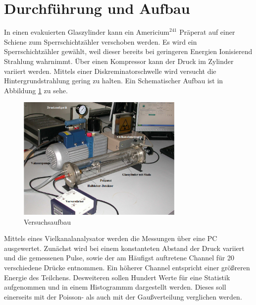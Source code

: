 \section{Durchführung und Aufbau}
\label{sec:Durchführung}
In einen evakuierten Glaszylinder kann ein $\text{Americium}^{241}$ Präperat auf einer Schiene zum Sperrschichtzähler verschoben werden. Es wird ein Sperrschichtzähler gewählt, weil dieser bereits bei geringeren Energien Ionisierend Strahlung wahrnimmt. Über einen Kompressor kann der Druck im Zylinder variiert werden. Mittels einer Diskreminatorschwelle wird versucht die Hintergrundstrahlung gering zu halten. Ein Schematischer Aufbau ist in Abbildung \ref{fig:Auf} zu sehe.
\begin{figure}
  \centering
  \includegraphics[height=6cm]{Aufbau.png}
  \caption{Versuchsaufbau}
  \label{fig:Auf}
\end{figure}
Mittels eines Vielkanalanalysator werden die Messungen über eine PC ausgewertet. Zunächst wird bei einem konstanteten Abstand der Druck variiert und die gemessenen Pulse, sowie der am Häufigst auftretene Channel für 20 verschiedene Drücke entnommen. Ein höherer Channel entspricht einer größreren Energie des Teilchens. 
Desweiteren sollen Hundert Werte für eine Statistik aufgenommen und in einem Histogrammm dargestellt werden. Dieses soll einerseits mit der Poisson- als auch mit der Gaußverteilung verglichen werden. 
